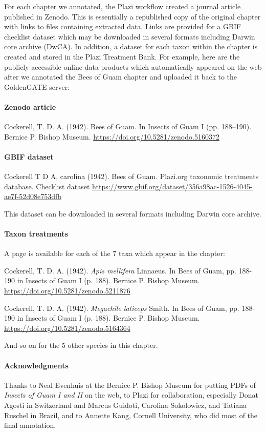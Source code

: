 \documentclass[12pt,letterpaper,english,bibliography=totocnumbered, abstract=on]{scrartcl}
\begin{document}
For each chapter we annotated, the Plazi workflow created a journal article published in Zenodo. This is essentially a republished copy of the original chapter with links to files containing extracted data. Links are provided for a GBIF checklist dataset which may be downloaded in several formats including Darwin core archive (DwCA). In addition, a dataset for each taxon within the chapter is created and stored in the Plazi Treatment Bank. For example, here are the publicly accessible online data products which automatically appeared on the web after we annotated the Bees of Guam chapter and uploaded it back to the GoldenGATE server:

\paragraph{Zenodo article} Cockerell, T. D. A. (1942). Bees of Guam. In Insects of Guam I (pp. 188–190). Bernice P. Bishop Museum. \url{https://doi.org/10.5281/zenodo.5160372}

\paragraph{GBIF dataset} Cockerell T D A, carolina (1942). Bees of Guam. Plazi.org taxonomic treatments database. Checklist dataset \url{https://www.gbif.org/dataset/356a98ac-1526-4045-ae7f-52d08e753dfb} 

This dataset can be downloaded in several formats including Darwin core archive.

\paragraph{Taxon treatments} A page is available for each of the 7 taxa which appear in the chapter:

\medskip
Cockerell, T. D. A. (1942). \textit{Apis mellifera} Linnaeus. In Bees of Guam, pp. 188-190 in Insects of Guam I (p. 188). Bernice P. Bishop Museum. \url{https://doi.org/10.5281/zenodo.5211876}

\medskip
Cockerell, T. D. A. (1942). \textit{Megachile laticeps} Smith. In Bees of Guam, pp. 188-190 in Insects of Guam I (p. 188). Bernice P. Bishop Museum. \url{https://doi.org/10.5281/zenodo.5164364}

\medskip
And so on for the 5 other species in this chapter.

\paragraph{Acknowledgments} Thanks to Neal Evenhuis at the Bernice P. Bishop Museum for putting PDFs of \textit{Insects of Guam I and II} on the web, to Plazi for collaboration, especially Donat Agosti in Switzerland and Marcus Guidoti, Carolina Sokolowicz, and Tatiana Ruschel in Brazil, and to Annette Kang, Cornell University, who did most of the final annotation.
\end{document}
